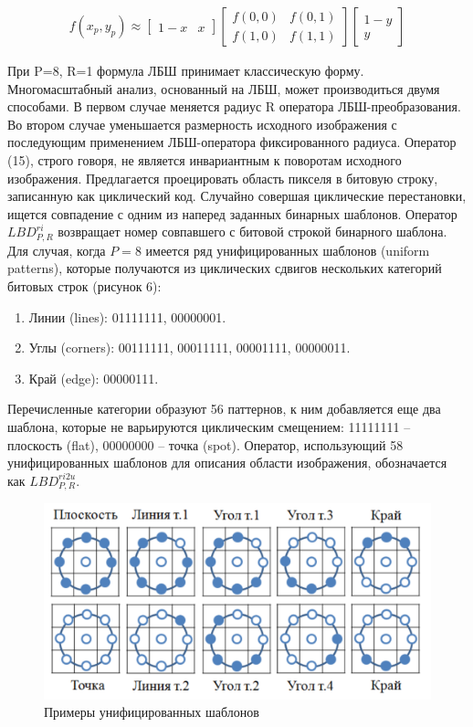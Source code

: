 \documentclass[a4paper, 14pt]{extarticle}	%
\begin{document}
\begin{gather}
f(x_p, y_p) \approx 
\begin{bmatrix}
  1-x & x
\end{bmatrix}
\begin{bmatrix}
  f(0,0) & f(0,1)\\
  f(1,0) & f(1,1)
\end{bmatrix}
\begin{bmatrix}
  1-y\\
  y
\end{bmatrix}
\end{gather}

При P=8, R=1 формула ЛБШ принимает классическую форму. Многомасштабный анализ, основанный на ЛБШ, может производиться  двумя способами. В первом случае меняется радиус R оператора ЛБШ-преобразования. Во  втором  случае  уменьшается  размерность  исходного  изображения  с последующим применением ЛБШ-оператора фиксированного радиуса. 
Оператор (15),  строго  говоря,  не  является  инвариантным  к  поворотам исходного изображения. Предлагается проецировать область пикселя в  битовую  строку,  записанную  как  циклический  код.  Случайно  совершая циклические  перестановки,  ищется  совпадение  с  одним  из  наперед  заданных бинарных шаблонов. Оператор $LBD_{P,R}^{ri}$ возвращает номер совпавшего с битовой строкой  бинарного  шаблона.  Для  случая,  когда $P=8$ имеется ряд унифицированных  шаблонов  (uniform patterns), которые 
получаются из циклических сдвигов нескольких категорий битовых строк (рисунок 6): 
\begin{enumerate}
\item Линии (lines): 01111111, 00000001.
\item Углы (corners): 00111111, 00011111, 00001111, 00000011.
\item Край (edge): 00000111.
\end{enumerate}

Перечисленные категории образуют 56 паттернов, к ним добавляется еще два шаблона,  которые  не  варьируются  циклическим  смещением:  11111111 --
плоскость  (flat),  00000000 -- точка  (spot).  Оператор,  использующий  58 унифицированных шаблонов для описания области изображения, обозначается как $LBD_{P,R}^{ri2u}$.

\begin{figure}[h!]
\centering
\includegraphics[scale=0.45]{res/pic006}
\caption{Примеры унифицированных шаблонов}
\end{figure}
\end{document}
